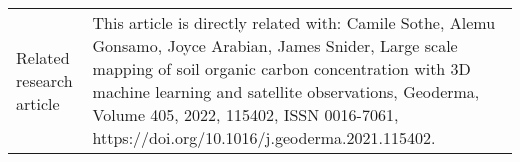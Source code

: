 \documentclass[times,final]{elsarticle}
\begin{document}
{\begin{longtable}{|p{33mm}|p{94mm}|}

\hline                         
Related                 
research\newline
article                &  This article is directly related with:\newline\newline
                            Camile Sothe, Alemu Gonsamo, Joyce Arabian, James Snider, Large scale mapping of soil organic carbon concentration with 3D machine learning and satellite observations, Geoderma, Volume 405, 2022, 115402, ISSN 0016-7061, https://doi.org/10.1016/j.geoderma.2021.115402.







\end{longtable}
}
\end{document}
